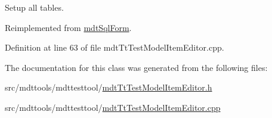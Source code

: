 Setup all tables. 



Reimplemented from \hyperlink{classmdt_sql_form_a27fe6e45aa5d4d7782aad9833e6de20b}{mdt\-Sql\-Form}.



Definition at line 63 of file mdt\-Tt\-Test\-Model\-Item\-Editor.\-cpp.



The documentation for this class was generated from the following files\-:\begin{DoxyCompactItemize}
\item 
src/mdttools/mdttesttool/\hyperlink{mdt_tt_test_model_item_editor_8h}{mdt\-Tt\-Test\-Model\-Item\-Editor.\-h}\item 
src/mdttools/mdttesttool/\hyperlink{mdt_tt_test_model_item_editor_8cpp}{mdt\-Tt\-Test\-Model\-Item\-Editor.\-cpp}\end{DoxyCompactItemize}
